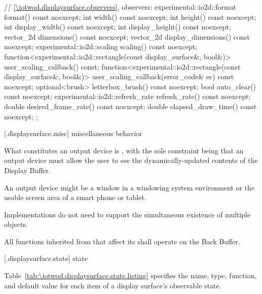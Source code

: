 \begin{codeblock}
{{    // \ref{\iotwod.displaysurface.observers}, observers:
    experimental::io2d::format format() const noexcept;
    int width() const noexcept;
    int height() const noexcept;
    int display_width() const noexcept;
    int display_height() const noexcept;
    vector_2d dimensions() const noexcept;
    vector_2d display_dimensions() const noexcept;
    experimental::io2d::scaling scaling() const noexcept;
    function<experimental::io2d::rectangle(const display_surface&,
      bool&)> user_scaling_callback() const;
    function<experimental::io2d::rectangle(const display_surface&,
      bool&)> user_scaling_callback(error_code& ec) const noexcept;
    optional<brush> letterbox_brush() const noexcept;
    bool auto_clear() const noexcept;
    experimental::io2d::refresh_rate refresh_rate() const noexcept;
    double desired_frame_rate() const noexcept;
    double elapsed_draw_time() const noexcept;
  };
}
\end{codeblock}

 [\iotwod.displaysurface.misc] { miscellaneous behavior}%

\pnum
What constitutes an output device is , with the sole constraint being that an output device must allow the user to see the dynamically-updated contents of the Display Buffer.
\begin{example}
An output device might be a window in a windowing system environment or the usable screen area of a smart phone or tablet.
\end{example}

\pnum
Implementations do not need to support the simultaneous existence of multiple  objects.

\pnum
All functions inherited from  that affect its \underlyingsurface shall operate on the Back Buffer.

 [\iotwod.displaysurface.state] { state}

\pnum
Table~\ref{tab:\iotwod.displaysurface.state.listing} specifies the name, type, function, and default value for each item of a display surface's observable state.

